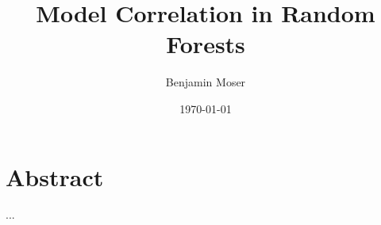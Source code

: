 \documentclass[
	twoside=false, %
]{kaobook}
\begin{document}

\title[Model Correlation in Random Forests]{Model Correlation in Random Forests}
\author[BM]{Benjamin Moser}
\date{\today}


\frontmatter %







\chapter*{Abstract}

...



\begingroup %

\setlength{\textheight}{230\vscale} %
\end{document}
